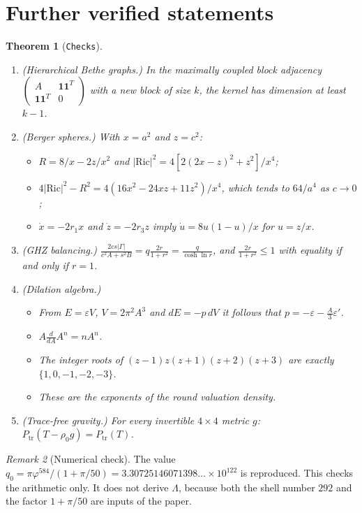 \documentclass[11pt]{article}
\newtheorem{theorem}{Theorem}[section]
\theoremstyle{remark}
\newtheorem{remark}[theorem]{Remark}
\newcommand{\lean}[1]{\texttt{#1}}
\begin{document}
\section{Further verified statements}
\begin{theorem}[\lean{Checks}]
\begin{enumerate}
\item (Hierarchical Bethe graphs.) In the maximally coupled block adjacency
$\begin{pmatrix}A&\mathbf 1\mathbf 1^T\\\mathbf 1\mathbf 1^T&0\end{pmatrix}$ with a new block of
size $k$, the kernel has dimension at least $k-1$.
\item (Berger spheres.) With $x=a^2$ and $z=c^2$:
\begin{itemize}
\item $R=8/x-2z/x^2$ and $|\mathrm{Ric}|^2=4[2(2x-z)^2+z^2]/x^4$;
\item $4|\mathrm{Ric}|^2-R^2=4(16x^2-24xz+11z^2)/x^4$, which tends to $64/a^4$ as $c\to0$;
\item $\dot x=-2r_1x$ and $\dot z=-2r_3z$ imply $\dot u=8u(1-u)/x$ for $u=z/x$.
\end{itemize}
\item (GHZ balancing.) $\frac{2cs|\Gamma|}{c^2A+s^2B}=q\frac{2r}{1+r^2}=\frac{q}{\cosh\ln r}$,
and $\frac{2r}{1+r^2}\le1$ with equality if and only if $r=1$.
\item (Dilation algebra.)
\begin{itemize}
\item From $E=\varepsilon V$, $V=2\pi^2A^3$ and $dE=-p\,dV$ it follows that
$p=-\varepsilon-\tfrac A3\varepsilon'$.
\item $A\frac{d}{dA}A^n=nA^n$.
\item The integer roots of $(z-1)z(z+1)(z+2)(z+3)$ are exactly $\{1,0,-1,-2,-3\}$.
\item These are the exponents of the round valuation density.
\end{itemize}
\item (Trace-free gravity.) For every invertible $4\times4$ metric $g$:
$P_{\mathrm{tr}}(T-\rho_0g)=P_{\mathrm{tr}}(T)$.
\end{enumerate}
\end{theorem}
\begin{remark}[Numerical check]
The value $q_0=\pi\varphi^{584}/(1+\pi/50)=3.30725146071398\ldots\times10^{122}$ is reproduced.
This checks the arithmetic only. It does not derive $\Lambda$, because both the shell number
$292$ and the factor $1+\pi/50$ are inputs of the paper.
\end{remark}
\end{document}
